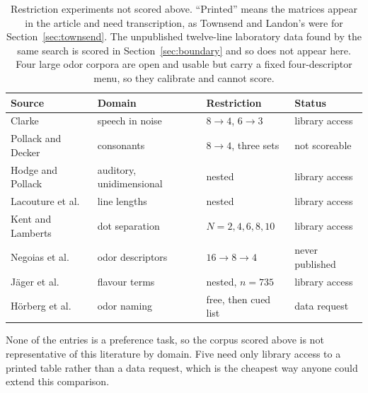 \documentclass[11pt]{article}
\begin{document}
\begin{table}[ht]
\centering
\small
\begin{tabular}{llll}
\toprule
Source & Domain & Restriction & Status \\
\midrule
Clarke \cite{clarke1957} & speech in noise & $8 \to 4$, $6 \to 3$ & library access \\
Pollack and Decker \cite{pollackdecker1960} & consonants & $8 \to 4$, three sets & not scoreable\footnotemark[9] \\
Hodge and Pollack & auditory, unidimensional & nested & library access \\
Lacouture et al. & line lengths & nested & library access \\
Kent and Lamberts & dot separation & $N = 2,4,6,8,10$ & library access \\
Negoias et al. & odor descriptors & $16 \to 8 \to 4$ & never published \\
J\"ager et al. & flavour terms & nested, $n = 735$ & library access \\
H\"orberg et al. & odor naming & free, then cued list & data request \\
\bottomrule
\end{tabular}
\caption{Restriction experiments not scored above. ``Printed'' means the matrices
appear in the article and need transcription, as Townsend and Landon's were for
Section~\ref{sec:townsend}. The unpublished twelve-line laboratory data found by the same search
is scored in Section~\ref{sec:boundary} and so does not appear here. Four large odor corpora are open and usable but carry a fixed
four-descriptor menu, so they calibrate and cannot score.}
\label{tab:census}
\end{table}


None of the entries is a preference task, so the corpus scored above is not representative of
this literature by domain. Five need only library access to a printed table rather than a data
request, which is the cheapest way anyone could extend this comparison.
\end{document}

